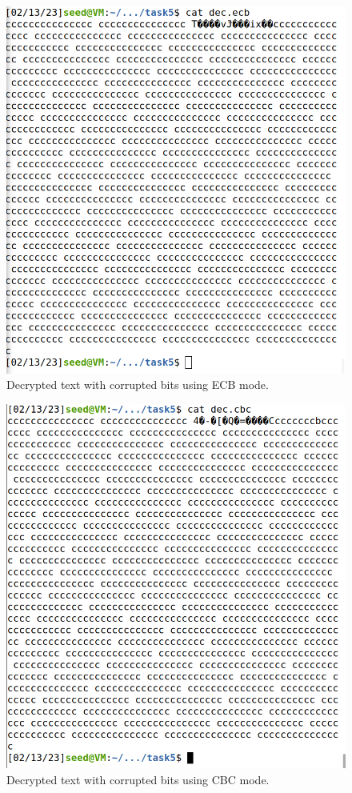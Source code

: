 \begin{figure}
    \centering
    \includegraphics[height=\textheight,width=\textwidth,keepaspectratio]
    {figures/dec_ecb_task5.png}
    \caption{Decrypted text with corrupted bits using ECB mode.}\label{fig:corrupted_ecb}
\end{figure}

\begin{figure}
    \centering
    \includegraphics[height=\textheight,width=\textwidth,keepaspectratio]
    {figures/dec_cbc_task5.png}
    \caption{Decrypted text with corrupted bits using CBC mode.}\label{fig:corrupted_cbc}
\end{figure}

